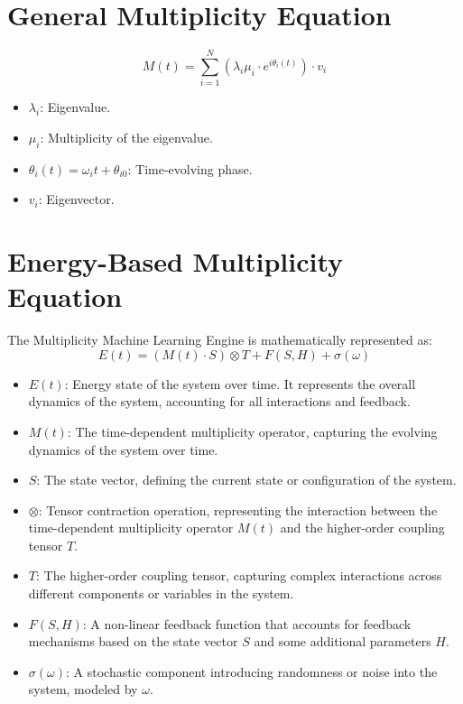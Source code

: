 \documentclass{article}
\theoremstyle{plain}
\begin{document}
\begin{itemize}
\section{General Multiplicity Equation}
\begin{equation}
M(t) = \sum_{i=1}^N \left( \lambda_i \mu_i \cdot e^{i\theta_i(t)} \right) \cdot v_i
\end{equation}
\begin{itemize}
    \item \( \lambda_i \): Eigenvalue.
    \item \( \mu_i \): Multiplicity of the eigenvalue.
    \item \( \theta_i(t) = \omega_i t + \theta_{i0} \): Time-evolving phase.
    \item \( v_i \): Eigenvector.
\end{itemize}

\section{Energy-Based Multiplicity Equation}

The Multiplicity Machine Learning Engine is mathematically represented as:
\begin{equation}
E(t) = (M(t) \cdot S) \otimes T + F(S, H) + \sigma(\omega)
\end{equation}

\begin{itemize}
    \item \textbf{\( E(t) \)}: Energy state of the system over time. It represents the overall dynamics of the system, accounting for all interactions and feedback.
    \item \textbf{\( M(t) \)}: The time-dependent multiplicity operator, capturing the evolving dynamics of the system over time.
    \item \textbf{\( S \)}: The state vector, defining the current state or configuration of the system.
    \item \textbf{\( \otimes \)}: Tensor contraction operation, representing the interaction between the time-dependent multiplicity operator \( M(t) \) and the higher-order coupling tensor \( T \).
    \item \textbf{\( T \)}: The higher-order coupling tensor, capturing complex interactions across different components or variables in the system.
    \item \textbf{\( F(S, H) \)}: A non-linear feedback function that accounts for feedback mechanisms based on the state vector \( S \) and some additional parameters \( H \).
    \item \textbf{\( \sigma(\omega) \)}: A stochastic component introducing randomness or noise into the system, modeled by \( \omega \).
\end{itemize}

\end{itemize}
\end{document}
